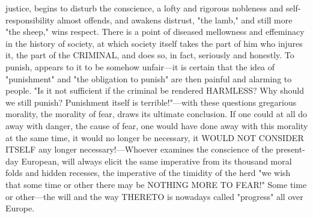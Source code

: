 \documentclass[12pt]{article}
\begin{document}
justice, begins to disturb the conscience, a lofty and rigorous nobleness and self-responsibility almost offends, and awakens distrust, "the lamb," and still more "the sheep," wins respect. There is a point of diseased mellowness and effeminacy in the history of society, at which society itself takes the part of him who injures it, the part of the CRIMINAL, and does so, in fact, seriously and honestly. To punish, appears to it to be somehow unfair---it is certain that the idea of "punishment" and "the obligation to punish" are then painful and alarming to people. "Is it not sufficient if the criminal be rendered HARMLESS? Why should we still punish? Punishment itself is terrible!"---with these questions gregarious morality, the morality of fear, draws its ultimate conclusion. If one could at all do away with danger, the cause of fear, one would have done away with this morality at the same time, it would no longer be necessary, it WOULD NOT CONSIDER ITSELF any longer necessary!---Whoever examines the conscience of the present-day European, will always elicit the same imperative from its thousand moral folds and hidden recesses, the imperative of the timidity of the herd "we wish that some time or other there may be NOTHING MORE TO FEAR!" Some time or other---the will and the way THERETO is nowadays called "progress" all over Europe.
\end{document}
